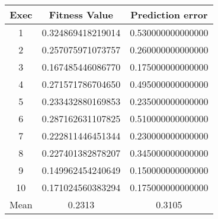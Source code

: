 \begin{table}[H]
\centering

\begin{tabular}{ccc}
\hline
Exec                     & Fitness Value                          & Prediction error                       \\ \hline
\multicolumn{1}{|c|}{1}  & \multicolumn{1}{c|}{0.324869418219014} & \multicolumn{1}{c|}{0.530000000000000} \\ \hline
\multicolumn{1}{|c|}{2}  & \multicolumn{1}{c|}{0.257075971073757} & \multicolumn{1}{c|}{0.260000000000000} \\ \hline
\multicolumn{1}{|c|}{3}  & \multicolumn{1}{c|}{0.167485446086770} & \multicolumn{1}{c|}{0.175000000000000} \\ \hline
\multicolumn{1}{|c|}{4}  & \multicolumn{1}{c|}{0.271571786704650} & \multicolumn{1}{c|}{0.495000000000000} \\ \hline
\multicolumn{1}{|c|}{5}  & \multicolumn{1}{c|}{0.233432880169853} & \multicolumn{1}{c|}{0.235000000000000} \\ \hline
\multicolumn{1}{|c|}{6}  & \multicolumn{1}{c|}{0.287162631107825} & \multicolumn{1}{c|}{0.510000000000000} \\ \hline
\multicolumn{1}{|c|}{7}  & \multicolumn{1}{c|}{0.222811446451344} & \multicolumn{1}{c|}{0.230000000000000} \\ \hline
\multicolumn{1}{|c|}{8}  & \multicolumn{1}{c|}{0.227401382878207} & \multicolumn{1}{c|}{0.345000000000000} \\ \hline
\multicolumn{1}{|c|}{9}  & \multicolumn{1}{c|}{0.149962454240649} & \multicolumn{1}{c|}{0.150000000000000} \\ \hline
\multicolumn{1}{|c|}{10} & \multicolumn{1}{c|}{0.171024560383294} & \multicolumn{1}{c|}{0.175000000000000} \\ \hline
Mean                     & 0.2313                                 & 0.3105                                 \\ \hline
\end{tabular}
\end{table}